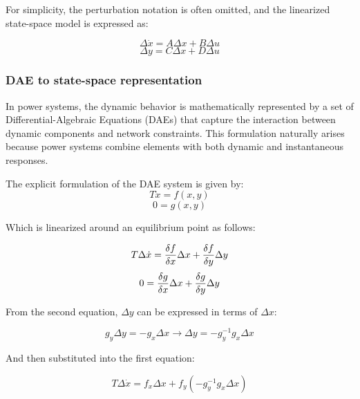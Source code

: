 For simplicity, the perturbation notation is often omitted, and the linearized state-space model is expressed as:
  
\begin{equation}
\Delta \dot{x} = A \Delta x + B \Delta u
\end{equation}
\begin{equation}
\Delta y = C \Delta x + D \Delta u
\end{equation}


\subsubsection{DAE to state-space representation}

In power systems, the dynamic behavior is mathematically represented by a set of Differential-Algebraic Equations (DAEs) 
that capture the interaction between dynamic components and network constraints. This formulation naturally arises because power systems
combine elements with both dynamic and instantaneous responses.

The explicit formulation of the DAE system is given by:
\begin{equation}
    T \dot{x} = f(x, y)
\end{equation}
\begin{equation}
    0 = g(x, y)
\end{equation}

Which is linearized around an equilibrium point as follows:

\begin{equation}
    T \Delta \dot{x} =\frac{\delta f}{\delta x}\Delta x + \frac{\delta f}{\delta y}\Delta y\\
\end{equation}
\begin{equation}
    0 =\frac{\delta g}{\delta x}\Delta x + \frac{\delta g}{\delta y}\Delta y\\
\end{equation}

From the second equation, $\Delta y$ can be expressed in terms of $\Delta x$:

\begin{equation}
    g_y\Delta y = -g_x \Delta x  \to \Delta y = - g_y^{-1} g_x \Delta x 
\end{equation}

And then substituted into the first equation:

\begin{equation}
    T \Delta \dot{x} = f_x\Delta x +f_y (- g_y^{-1} g_x  \Delta x) 
\end{equation}


